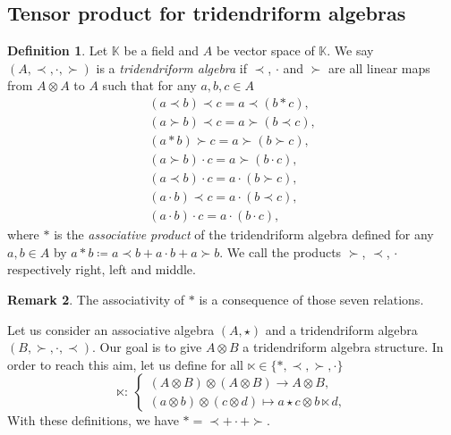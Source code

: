 \documentclass[pdftex]{sigma}
\numberwithin{equation}{section}
\theoremstyle{definition}
\newtheorem{defi}{Definition}[section]
\newtheorem{Rq}[defi]{Remark}
\theoremstyle{plain}
\newcommand{\K}{\mathbb{K}}
\begin{document}
\subsection{Tensor product for tridendriform algebras} \label{sec:tensor}
\begin{defi}\label{def:tridend}
	Let $\K$ be a field and $A$ be vector space of $\K$. We say $(A,\prec,\cdot,\succ)$ is a \emph{tridendriform algebra} if $\prec$, $\cdot$ and $\succ$ are all linear maps from $A\otimes A$ to $A$ such that for any $a,b,c\in A$
	\begin{gather}
		(a\prec b)\prec c =a\prec(b*c), \label{tri1}\\
		(a\succ b)\prec c =a\succ(b\prec c), \label{tri2}\\
		(a* b)\succ c =a\succ(b\succ c), \label{tri3} \\
		(a\succ b)\cdot c =a\succ(b\cdot c), \label{tri4} \\
		(a\prec b)\cdot c =a\cdot(b\succ c), \label{tri5} \\
		(a\cdot b)\prec c =a\cdot(b\prec c), \label{tri6} \\
		(a\cdot b)\cdot c =a\cdot (b\cdot c), \label{tri7}
	\end{gather}
where $*$ is the \emph{associative product} of the tridendriform algebra defined for any $a,b\in A$ by $a*b\coloneqq a\prec b + a\cdot b +a\succ b$.
We call the products $\succ$, $\prec$, $\cdot$ respectively right, left and middle.
\end{defi}
\begin{Rq}
	The associativity of $*$ is a consequence of those seven relations.
\end{Rq}
 Let us consider an associative algebra $(A,\star)$ and a tridendriform algebra $(B,\succ,\cdot,\prec)$.
 Our goal is to give $A\otimes B$ a tridendriform algebra structure. In order to reach this aim, let us define for all $\ltimes\in\{*,\prec,\succ,\cdot\}$
\begin{equation*}
\ltimes\colon \ \begin{cases}
(A\otimes B)\otimes (A\otimes B) \rightarrow A\otimes B, \\
(a\otimes b)\otimes (c\otimes d)\mapsto a \star c\otimes b\ltimes d,
\end{cases}
\end{equation*}
 With these definitions, we have $*=\prec +\cdot +\succ$.
\end{document}
